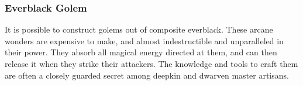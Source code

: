 \subsubsection{Everblack Golem}
\label{sec:Everblack Golem}

It is possible to construct golems out of composite everblack. These arcane
wonders are expensive to make, and almost indestructible and unparalleled in
their power. They absorb all magical energy directed at them, and can then
release it when they strike their attackers. The knowledge and tools to craft
them are often a closely guarded secret among deepkin and dwarven master
artisans.
